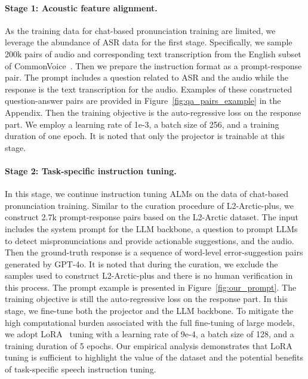 \documentclass[11pt]{article}
\begin{document}

\paragraph{Stage 1: Acoustic feature alignment.} As the training data for chat-based pronunciation training are limited, we leverage the abundance of ASR data for the first stage. Specifically, we sample 200k pairs of audio and corresponding text transcription from the English subset of CommonVoice~\cite{ardila-etal-2020-common}. Then we prepare the instruction format as a prompt-response pair. The prompt includes a question related to ASR and the audio while the response is the text transcription for the audio. Examples of these constructed question-answer pairs are provided in Figure~\ref{fig:qa_pairs_example} in the Appendix. Then the training objective is the auto-regressive loss on the response part. We employ a learning rate of 1e-3, a batch size of 256, and a training duration of one epoch. It is noted that only the projector is trainable at this stage.


\paragraph{Stage 2: Task-specific instruction tuning.} In this stage, we continue instruction tuning ALMs on the data of chat-based pronunciation training. Similar to the curation procedure of L2-Arctic-plus, we construct 2.7k prompt-response pairs based on the L2-Arctic dataset. The input includes the system prompt for the LLM backbone, a question to prompt LLMs to detect mispronunciations and provide actionable suggestions, and the audio. Then the ground-truth response is a sequence of word-level error-suggestion pairs generated by GPT-4o. It is noted that during the curation, we exclude the samples used to construct  L2-Arctic-plus and there is no human verification in this process. The prompt example is presented in Figure~\ref{fig:our_prompt}. The training objective is still the auto-regressive loss on the response part. In this stage, we fine-tune both the projector and the LLM backbone. To mitigate the high computational burden associated with the full fine-tuning of large models, we adopt LoRA~\cite{lora} tuning with a learning rate of 9e-4, a batch size of 128, and a training duration of 5 epochs.  Our empirical analysis demonstrates that LoRA tuning is sufficient to highlight the value of the dataset and the potential benefits of task-specific speech instruction tuning.
\end{document}

